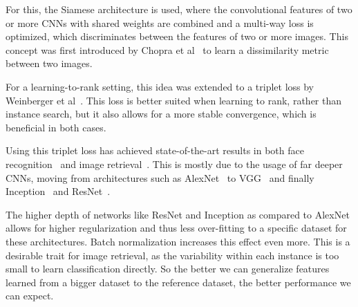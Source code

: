 \documentclass[fleqn]{article}
\begin{document}
For this, the Siamese architecture is used, where the convolutional
features of two or more CNNs with shared weights are combined and a
multi-way loss is optimized, which discriminates between the features
of two or more images.
This concept was first introduced by
Chopra et al~\cite{chopra_learning_2005} to learn a dissimilarity metric
between two images.

For a learning-to-rank setting, this idea was extended to a triplet loss
by Weinberger et al~\cite{weinberger_distance_2006}.
This loss is better suited when learning to rank, rather than instance
search, but it also allows for a more stable convergence, which is
beneficial in both cases.

Using this triplet loss has achieved state-of-the-art results in both
face recognition~\cite{schroff_facenet:_2015} and
image retrieval~\cite{gordo_deep_2016}. This is mostly due to the usage
of far deeper CNNs, moving from architectures such as
AlexNet~\cite{krizhevsky_imagenet_2012} to VGG~\cite{simonyan_very_2014}
and finally Inception~\cite{szegedy_inception-v4_2016} and
ResNet~\cite{he_deep_2015}.

The higher depth of networks like ResNet and Inception as compared to
AlexNet allows for higher regularization and thus less over-fitting
to a specific dataset for these architectures. Batch normalization
increases this effect even more. This is a desirable trait for image
retrieval, as the variability within each instance is too small to
learn classification directly. So the better we can generalize
features learned from a bigger dataset to the reference dataset,
the better performance we can expect.
\end{document}
